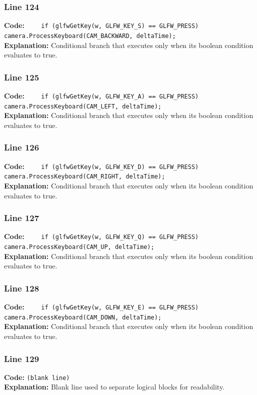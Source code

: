 \documentclass[11pt,a4paper]{article}
\begin{document}
\subsubsection*{Line 124}
\textbf{Code:} \verb|    if (glfwGetKey(w, GLFW_KEY_S) == GLFW_PRESS) camera.ProcessKeyboard(CAM_BACKWARD, deltaTime);|\\
\textbf{Explanation:} Conditional branch that executes only when its boolean condition evaluates to true.

\subsubsection*{Line 125}
\textbf{Code:} \verb|    if (glfwGetKey(w, GLFW_KEY_A) == GLFW_PRESS) camera.ProcessKeyboard(CAM_LEFT, deltaTime);|\\
\textbf{Explanation:} Conditional branch that executes only when its boolean condition evaluates to true.

\subsubsection*{Line 126}
\textbf{Code:} \verb|    if (glfwGetKey(w, GLFW_KEY_D) == GLFW_PRESS) camera.ProcessKeyboard(CAM_RIGHT, deltaTime);|\\
\textbf{Explanation:} Conditional branch that executes only when its boolean condition evaluates to true.

\subsubsection*{Line 127}
\textbf{Code:} \verb|    if (glfwGetKey(w, GLFW_KEY_Q) == GLFW_PRESS) camera.ProcessKeyboard(CAM_UP, deltaTime);|\\
\textbf{Explanation:} Conditional branch that executes only when its boolean condition evaluates to true.

\subsubsection*{Line 128}
\textbf{Code:} \verb|    if (glfwGetKey(w, GLFW_KEY_E) == GLFW_PRESS) camera.ProcessKeyboard(CAM_DOWN, deltaTime);|\\
\textbf{Explanation:} Conditional branch that executes only when its boolean condition evaluates to true.

\subsubsection*{Line 129}
\textbf{Code:} \texttt{(blank line)}\\
\textbf{Explanation:} Blank line used to separate logical blocks for readability.
\end{document}
